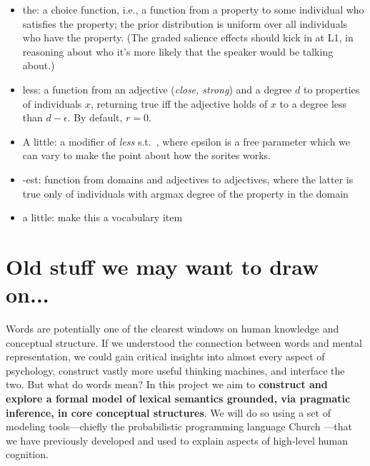 \documentclass[12pt]{article}
\begin{document}
\begin{itemize}
\item the: a choice function, i.e., a function from a property to some individual who satisfies the property; the prior distribution is uniform over all individuals who have the property. (The graded salience effects should kick in at L1, in reasoning about who it's more likely that the speaker would be talking about.)
\item less: a function from an adjective (\emph{close, strong}) and a degree $d$ to properties of individuals $x$, returning true iff the adjective holds of $x$ to a degree less than $d - \epsilon$. By default, $r = 0$. 
\item A little: a modifier of \emph{less} s.t.\ , where epsilon is a free parameter which we can vary to make the point about how the sorites works.
\item -est: function from domains and adjectives to adjectives, where the latter is true only of individuals with argmax degree of the property in the domain
\item a little: make this a vocabulary item  
\end{itemize} 



\appendix

\section{Old stuff we may want to draw on...}


Words are potentially one of the clearest windows on human knowledge and conceptual structure. If we understood the connection between words and mental representation, we could gain critical insights into almost every aspect of psychology, construct vastly more useful thinking machines, and interface the two. But what do words mean? In this project we aim to {\bf construct and explore a formal model of lexical semantics grounded, via pragmatic inference, in core conceptual structures}. We will do so using a set of modeling tools---chiefly the probabilistic programming language Church \cite{goodman2008}---that we have previously developed and used to explain  aspects of high-level human cognition.
\end{document}
